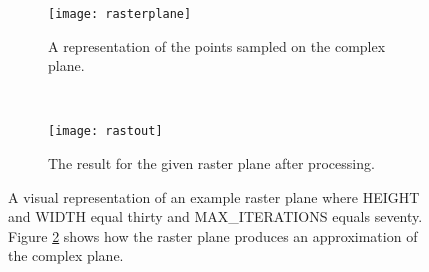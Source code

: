 \begin{figure}[h]
\centering

\begin{subfigure}[b]{0.4\textwidth}
  \centering    
  \texttt{[image: rasterplane]}
  \caption{
     \tiny A representation of the points sampled on the complex plane.
  }
  \label{fig:rast-1}
\end{subfigure}
~ %
\begin{subfigure}[b]{0.4\textwidth}
  \centering
  \texttt{[image: rastout]}
  \caption{
     \tiny The result for the given raster plane after processing.
  }
  \label{fig:rast-2}
\end{subfigure}

\caption{
    A visual representation of an example raster plane where HEIGHT and WIDTH equal
    thirty and MAX\_ITERATIONS equals seventy. Figure \ref{fig:rast-2} shows how the
    raster plane produces an approximation of the complex plane.
}
\label{fig:rasterdemo}
\end{figure}

